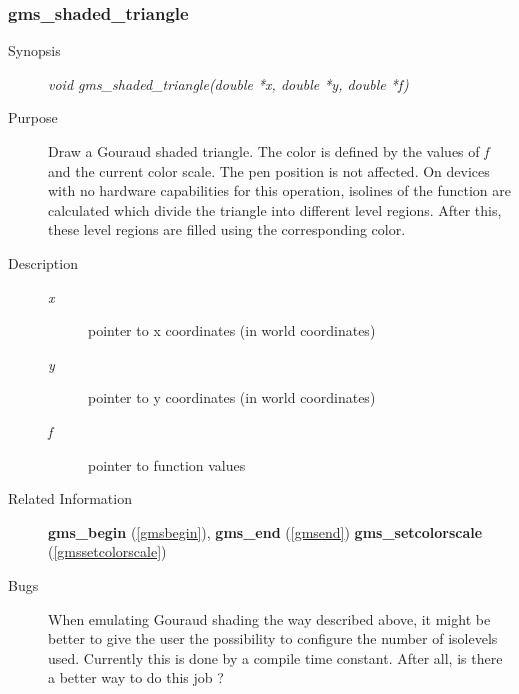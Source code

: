 \subsubsection{gms\_shaded\_triangle\label{gmsshadedtriangle}}
\begin{description}
\item[Synopsis]\mbox{}


{\em void    gms\_shaded\_triangle(double *x, double *y, double *f)\/}
\item[Purpose]\mbox{}


Draw a Gouraud shaded triangle. The color is defined by
the values of {\em f\/} and the current color scale.
The pen position is not affected.
On devices with no hardware capabilities for this operation,
isolines of the function are calculated which divide the 
triangle into different level regions. After this, these 
level regions are filled using the corresponding color.
\item[Description]\mbox{}


\begin{description}
\item[{\em x\/}]\mbox{}

 pointer to x coordinates (in world coordinates)
\item[{\em y\/}]\mbox{}

 pointer to y coordinates (in world coordinates)
\item[{\em f\/}]\mbox{}

 pointer to function values
\end{description}

\item[Related Information]\mbox{}


{\bf gms\_begin} (\ref{gmsbegin}), 
{\bf gms\_end} (\ref{gmsend})
{\bf gms\_setcolorscale} (\ref{gmssetcolorscale})
\item[Bugs]\mbox{}


When emulating Gouraud shading the way described above,
it might be better to give the user the possibility 
to configure the number of isolevels used. Currently this
is done by a compile time constant.
After all, is there a better way to do   this job ?

\end{description}





\newpage



